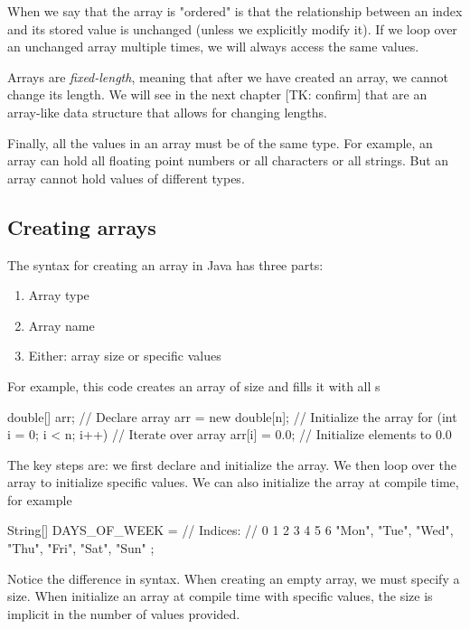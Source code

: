 When we say that the array is "ordered" is that the relationship between an index and its stored value is unchanged (unless we explicitly modify it). If we loop over an unchanged array multiple times, we will always access the same values.

Arrays are \emph{fixed-length}, meaning that after we have created an array, we cannot change its length. We will see in the next chapter [TK: confirm] that  are an array-like data structure that allows for changing lengths.

Finally, all the values in an array must be of the same type. For example, an array can hold all floating point numbers or all characters or all strings. But an array cannot hold values of different types.

\subsection{Creating arrays}

The syntax for creating an array in Java has three parts:
\begin{enumerate}
\item Array type
\item Array name
\item Either: array size or specific values
\end{enumerate}

For example, this code creates an array of size  and fills it with all s

\begin{code}
double[] arr;                    // Declare array
arr = new double[n];             // Initialize the array
for (int i = 0; i < n; i++) {    // Iterate over array
    arr[i] = 0.0;                // Initialize elements to 0.0
}
\end{code}

The key steps are: we first declare and initialize the array. We then loop over the array to initialize specific values. We can also initialize the array at compile time, for example

\begin{code}
String[] DAYS_OF_WEEK = {
//  Indices:
//  0      1      2      3      4      5      6
    "Mon", "Tue", "Wed", "Thu", "Fri", "Sat", "Sun"
};
\end{code}

Notice the difference in syntax. When creating an empty array, we must specify a size. When initialize an array at compile time with specific values, the size is implicit in the number of values provided.


